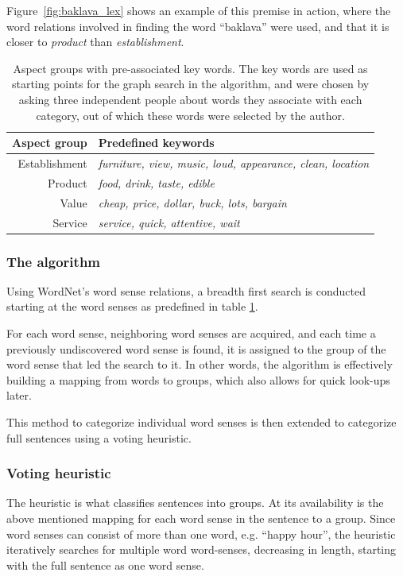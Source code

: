 \documentclass[a4paper,11pt]{kth-mag}
\begin{document}
Figure~\ref{fig:baklava_lex} shows an example of this premise in action,
where the word relations involved in finding the word ``baklava'' were used,
and that it is closer to \emph{product} than \emph{establishment}.

\begin{table}[b]
  \centering
  \begin{tabular}{| r | l |}
    \hline
    \textbf{Aspect group} & \textbf{Predefined keywords}\\ \hline
    Establishment & \emph{furniture, view, music, loud, appearance, clean, location}\\ \hline
    Product & \emph{food, drink, taste, edible}\\ \hline
    Value & \emph{cheap, price, dollar, buck, lots, bargain}\\ \hline
    Service & \emph{service, quick, attentive, wait}\\ \hline
  \end{tabular}
  \caption{Aspect groups with pre-associated key words. The key words are used as starting points for the graph search in the algorithm, and were chosen by asking three independent people about words they associate with each category, out of which these words were selected by the author.}
  \label{tab:cat_words}
\end{table}

\subsubsection{The algorithm}
Using WordNet's \cite{wordnet} word sense relations, a  breadth first search is conducted
starting at the word senses as predefined in table \ref{tab:cat_words}.

For each word sense, neighboring word senses are acquired, and each time a previously undiscovered word sense
is found, it is assigned to the group of the word sense that led the search to it. In other words, the algorithm
is effectively building a mapping from words to groups, which also allows for quick look-ups later.

This method to categorize individual word senses is then extended to categorize full sentences using
a voting heuristic.

\subsubsection{Voting heuristic}
The heuristic is what classifies sentences into groups.
At its availability is the above mentioned mapping for each word sense in the sentence to a group.
Since word senses can consist of more than one word,
e.g. ``happy hour'', the heuristic iteratively searches for multiple word word-senses,
decreasing in length, starting with the full sentence as one word sense.
\end{document}

